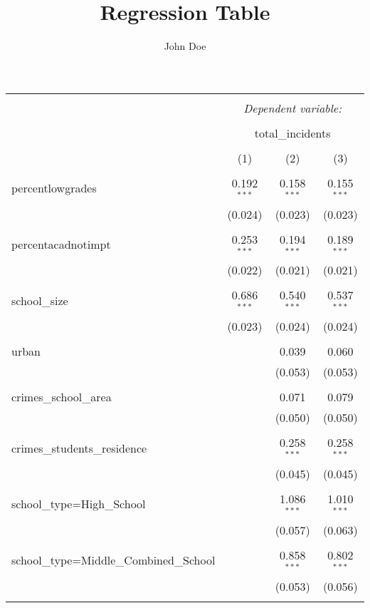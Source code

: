 \documentclass[12pt]{article}
\author{John Doe}
\title{Regression Table}
\begin{document}
\setcounter{table}{6}

\begin{table}[!htbp] \centering 
\begin{adjustbox}{width=1\textwidth}
\small
\begin{tabular}{@{\extracolsep{5pt}}lccc} 
\\[-1.8ex]\hline 
\hline \\[-1.8ex] 
 & \multicolumn{3}{c}{\textit{Dependent variable:}} \\ 
\cline{2-4} 
\\[-1.8ex] & \multicolumn{3}{c}{total\_incidents} \\ 
\\[-1.8ex] & (1) & (2) & (3)\\ 
\hline \\[-1.8ex] 
 percentlowgrades & 0.192$^{***}$ & 0.158$^{***}$ & 0.155$^{***}$ \\ 
  & (0.024) & (0.023) & (0.023) \\ 
  & & & \\ 
 percentacadnotimpt & 0.253$^{***}$ & 0.194$^{***}$ & 0.189$^{***}$ \\ 
  & (0.022) & (0.021) & (0.021) \\ 
  & & & \\ 
 school\_size & 0.686$^{***}$ & 0.540$^{***}$ & 0.537$^{***}$ \\ 
  & (0.023) & (0.024) & (0.024) \\ 
  & & & \\ 
 urban &  & 0.039 & 0.060 \\ 
  &  & (0.053) & (0.053) \\ 
  & & & \\ 
 crimes\_school\_area &  & 0.071 & 0.079 \\ 
  &  & (0.050) & (0.050) \\ 
  & & & \\ 
 crimes\_students\_residence &  & 0.258$^{***}$ & 0.258$^{***}$ \\ 
  &  & (0.045) & (0.045) \\ 
  & & & \\ 
 school\_type=High\_School &  & 1.086$^{***}$ & 1.010$^{***}$ \\ 
  &  & (0.057) & (0.063) \\ 
  & & & \\ 
 school\_type=Middle\_Combined\_School &  & 0.858$^{***}$ & 0.802$^{***}$ \\ 
  &  & (0.053) & (0.056) \\ 
  & & & \\ 

\end{tabular}
\end{adjustbox}
\end{table}
\end{document}
